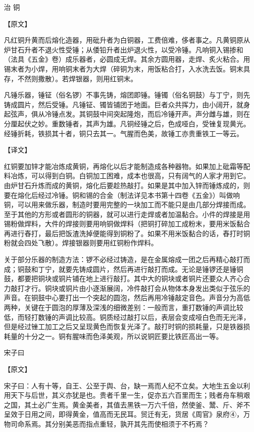 \documentclass[12pt,UTF8]{ctexbook}
\begin{document}
治 铜

【原文】

凡红铜升黄而后熔化造器，用砒升者为白铜器，工费倍难，侈者事之。凡黄铜原从炉甘石升者不退火性受锤；从倭铅升者出炉退火性，以受冷锤。凡响铜入锡掺和（法具《五金》卷）成乐器者，必圆成无焊。其余方圆用器，走焊、炙火粘合。用锡末者为小焊，用响铜末者为大焊（碎铜为末，用饭粘合打，入水洗去饭。铜末具存，不然则撒散）。若焊银器，则用红铜末。

凡锤乐器，锤钲（俗名锣）不事先铸，熔团即锤。锤镯（俗名铜鼓）与丁宁，则先铸成圆片，然后受锤。凡锤钲、镯皆铺团于地面。巨者众共挥力，由小阔开，就身起弦声，俱从冷锤点发。其铜鼓中间突起隆炮，而后冷锤开声。声分雌与雄，则在分厘起伏之妙。重数锤者，其声为雄。凡铜经锤之后，色成哑白，受锉复现黄光。经锤折耗，铁损其十者，铜只去其一。气腥而色美，故锤工亦贵重铁工一等云。

【译文】

红铜要加锌才能冶炼成黄铜，再熔化以后才能制造成各种器物。如果加上砒霜等配料冶炼，可以得到白铜。白铜加工困难，成本也很高，只有阔气的人家才用到它。由炉甘石升炼而成的黄铜，熔化后要趁热敲打。如果是其中加入锌而锤炼成的，则要在熔化后经过冷锤。铜和锡的合金（制法详见本书第十四卷《五金》）叫做响铜，可以用来做乐器，制造时要用完整的一块加工而不能只是由几部分焊接而成。至于其他的方形或者圆形的铜器，就可以进行走焊或者加温黏合。小件的焊接是用锡粉做焊料，大件的焊接则要用响铜做焊料（把铜打碎加工成粉末，要用米饭黏合再进行舂打，最后把饭渣洗掉便能得到铜粉了。如果不用米饭黏合的话，舂打时铜粉就会四处飞散）。焊接银器则要用红铜粉作焊料。

关于部分乐器的制造方法：锣不必经过铸造，是在金属熔成一团之后再精心敲打而成；铜鼓和丁宁，就要先铸成圆片，然后再进行敲打而成。无论是锤锣还是锤铜鼓，都要把铜块或铜片铺在地上进行敲打。其中大的铜块或者铜片还要众人齐心合力敲打才行。铜块或铜片由小逐渐展阔，冷件敲打会从物体本身发出类似于弦乐的声音。在铜鼓中心要打出一个突起的圆泡，然后再用冷锤敲定音色。声音分为高低两种，关键在于圆泡的厚薄及深浅的细微差别：一般而言，重打数锤的声调比较低，而轻打数锤的声调比较高。铜质经过敲打以后，表层会变成哑白色而无光泽，但是经过锉工加工之后又呈现黄色而恢复光泽了。敲打时铜的损耗量，只是铁器损耗量的十分之一。铜有腥味而色泽美观，所以说铜匠要比铁匠高出一等。

宋子曰

【原文】

宋子曰：人有十等，自王、公至于舆、台，缺一焉而人纪不立矣。大地生五金以利用天下与后世，其义亦犹是也。贵者千里一生，促亦五六百里而生；贱者舟车稍艰之国，其土必广生焉。黄金美者，其值去黑铁一万六千倍，然使釜、鬵、斤、斧不呈效于日用之间，即得黄金，值高而无民耳。贸迁有无，货居《周官》泉府④，万物司命系焉。其分别美恶而指点重轻，孰开其先而使相须于不朽焉？
\end{document}
